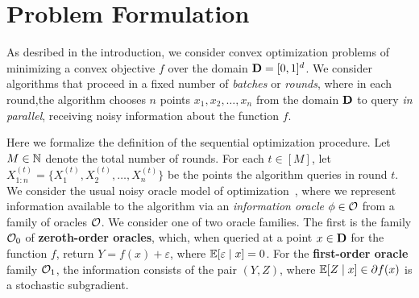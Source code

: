 \newcommand{\orc}{\phi}
\newcommand{\alg}{\mathsf{A}}

\section{Problem Formulation}

As desribed in the introduction, we consider convex optimization problems of
minimizing a convex objective $f$ over the domain $\mathbf{D} = [0, 1]^d$. We
consider algorithms that proceed in a fixed number of \emph{batches} or
\emph{rounds}, where in each round,the algorithm chooses $n$ points $x_1,
x_2, \ldots, x_n$ from the domain $\mathbf{D}$ to query \emph{in parallel},
receiving noisy information about the function $f$.


Here we formalize the definition of the sequential optimization procedure.
Let $M \in \mathbb{N}$ denote the total number of rounds. For each $t \in [M]$, let
$X_{1:n}^{(t)} = \{X_{1}^{(t)}, X_2^{(t)}, \ldots, X_n^{(t)}\}$ be the
points the algorithm queries in round $t$.  We consider the usual noisy
oracle model of optimization~\citep{NemirovskiYu83, AgarwalBaRaWa12}, where
we represent information available to the algorithm via an \emph{information
  oracle} $\orc \in \ofamily$ from a family of oracles $\mathcal{O}$.  We
consider one of two oracle families. The first is the family $\mathcal{O}_0$ of
\textbf{zeroth-order oracles}, which, when queried at a point $x \in
\mathbf{D}$ for the function $f$, return $Y = f(x) + \varepsilon$, where
$\mathbb{E}[\varepsilon \mid x] = 0$. For the \textbf{first-order oracle} family
$\mathcal{O}_1$, the information consists of the pair $(Y, Z)$, where $\mathbb{E}[Z \mid
  x] \in \partial f(x)$ is a stochastic subgradient.

